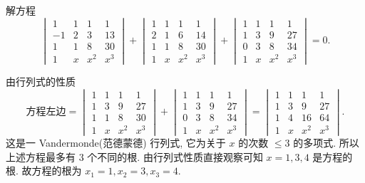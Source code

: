 \documentclass[../../main.tex]{subfiles}%
\begin{document}
\begin{example}
解方程
\[
\begin{vmatrix} 1 & 1 & 1 & 1 \\ -1 & 2 & 3 & 13 \\ 1 & 1 & 8 & 30 \\ 1 & x & x^2 & x^3 \end{vmatrix} + \begin{vmatrix} 1 & 1 & 1 & 1 \\ 2 & 1 & 6 & 14 \\ 1 & 1 & 8 & 30 \\ 1 & x & x^2 & x^3 \end{vmatrix} + \begin{vmatrix} 1 & 1 & 1 & 1 \\ 1 & 3 & 9 & 27 \\ 0 & 3 & 8 & 34 \\ 1 & x & x^2 & x^3 \end{vmatrix} = 0.
\]
\end{example}
\begin{solution}

由行列式的性质
\[
\text{方程左边} = \begin{vmatrix} 1 & 1 & 1 & 1 \\ 1 & 3 & 9 & 27 \\ 1 & 1 & 8 & 30 \\ 1 & x & x^2 & x^3 \end{vmatrix} + \begin{vmatrix} 1 & 1 & 1 & 1 \\ 1 & 3 & 9 & 27 \\ 0 & 3 & 8 & 34 \\ 1 & x & x^2 & x^3 \end{vmatrix} = \begin{vmatrix} 1 & 1 & 1 & 1 \\ 1 & 3 & 9 & 27 \\ 1 & 4 & 16 & 64 \\ 1 & x & x^2 & x^3 \end{vmatrix}.
\]
这是一 Vandermonde(范德蒙德) 行列式, 它为关于 \(x\) 的次数 \(\leqslant 3\) 的多项式. 所以上述方程最多有 \(3\) 个不同的根. 由行列式性质直接观察可知 \(x = 1, 3, 4\) 是方程的根. 故方程的根为 \(x_1 = 1, x_2 = 3, x_3 = 4\).

\end{solution}
\end{document}
